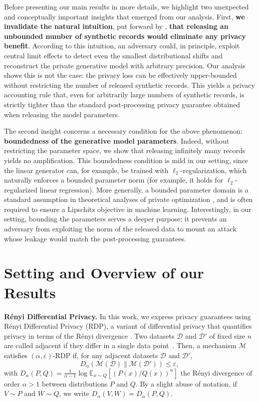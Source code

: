 \documentclass{article}
\theoremstyle{plain}
\theoremstyle{definition}
\theoremstyle{remark}
\begin{document}
Before presenting our main results in more details, we highlight two unexpected and conceptually important insights that emerged from our analysis. First, \textbf{we invalidate the natural intuition}, put forward by \citet{pierquin2025}, \textbf{that releasing an unbounded number of synthetic records would eliminate any privacy benefit}. According to this intuition, an adversary could, in principle, exploit central limit effects to detect even the smallest distributional shifts and reconstruct the private generative model with arbitrary precision.
Our analysis shows this is not the case: the privacy loss can be effectively upper-bounded without restricting the number of released synthetic records. This yields a privacy accounting rule that, even for arbitrarily large numbers of synthetic records, is strictly tighter than the standard post-processing privacy guarantee obtained when releasing the model parameters.

 
The second insight concerns a necessary condition for the above phenomenon: \textbf{boundedness of the generative model parameters}. Indeed, without restricting the parameter space, we show that releasing infinitely many records yields no amplification.
This boundedness condition is mild in our setting, since the linear generator can, for example, be trained with $\ell_2$-regularization, which naturally enforces a bounded parameter norm (for example, it holds for $\ell_2$-regularized linear regression). More generally, a bounded parameter domain is a standard assumption in theoretical analyses of private optimization \citep{Bassily2014a,Feldman2018,Altschuler2022}, and is often required to ensure a Lipschitz objective in machine learning.
Interestingly, in our setting, bounding the parameters serves a deeper purpose: it prevents an adversary from exploiting the norm of the released data to mount an attack whose leakage would match the post-processing guarantees.


\section{Setting and Overview of our Results}
\label{sec:l_infty}

\textbf{Rényi Differential Privacy.} 
In this work, we express privacy guarantees using Rényi Differential Privacy (RDP), a variant of differential privacy that quantifies privacy in terms of the Rényi divergence \citep{Mironov2017}. %
Two datasets $\mathcal{D}$ and $\mathcal{D}'$ of fixed size $n$ are called adjacent if they differ in a single data point~\citep{Mironov2017}. Then, a mechanism $\mathcal{M}$ satisfies $(\alpha, \varepsilon)$-RDP if, for any adjacent datasets $\mathcal{D}$ and $\mathcal{D}'$,
$$
D_\alpha(\mathcal{M}(\mathcal{D}) \| \mathcal{M}(\mathcal{D}')) \leq \varepsilon,
$$
with $D_\alpha(P,Q) = \frac{1}{\alpha-1} \log \mathbb{E}_{x \sim Q}[(P(x)/Q(x))^\alpha]$ the Rényi divergence of order $\alpha>1$ between distributions $P$ and $Q$. By a slight abuse of notation, if $V \sim P$ and $W \sim Q$, we write $D_\alpha(V,W) = D_\alpha(P,Q)$.  
\end{document}
